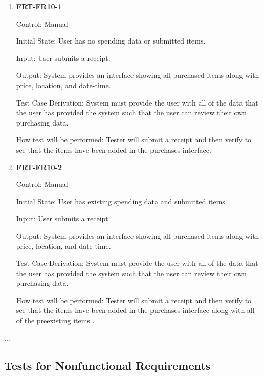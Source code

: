 \documentclass[12pt, titlepage]{article}
\begin{document}
\begin{enumerate}

\item{\textbf{FRT-FR10-1}}

Control: Manual
          
Initial State: User has no spending data or submitted items.

Input: User submits a receipt.
          
Output: System provides an interface showing all purchased items along with price, location, and date-time.

Test Case Derivation: System must provide the user with all of the data that the user has provided the system such that the user can review their own purchasing data.
          
How test will be performed: Tester will submit a receipt and then verify to see that the items have been added in the purchases interface.

\item{\textbf{FRT-FR10-2}}

Control: Manual
          
Initial State: User has existing spending data and submitted items.

Input: User submits a receipt.
          
Output: System provides an interface showing all purchased items along with price, location, and date-time.

Test Case Derivation: System must provide the user with all of the data that the user has provided the system such that the user can review their own purchasing data.
          
How test will be performed: Tester will submit a receipt and then verify to see that the items have been added in the purchases interface along with all of the preexisting items .

\end{enumerate}

...

\subsection{Tests for Nonfunctional Requirements}

\end{document}
